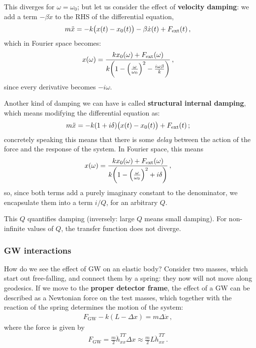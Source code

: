 \documentclass[main.tex]{subfiles}
\begin{document}
This diverges for \(\omega = \omega_0 \); but let us consider the effect of \textbf{velocity damping}: we add a term \(- \beta \dot{x}\) to the RHS of the differential equation,
%
\begin{align}
m \ddot{x} = - k \qty(x(t) - x_0 (t)) - \beta \dot{x}(t) + F _{\text{ext}}(t)
\,,
\end{align}
%
which in Fourier space becomes:
%
\begin{align}
x(\omega ) = \frac{k x_0 (\omega ) + F _{\text{ext}}(\omega )}{k \qty(1 - \qty( \frac{\omega}{\omega_0 })^2 - \frac{i \omega \beta }{k})}
\,,
\end{align}
%
since every derivative becomes \(- i \omega \). 

Another kind of damping we can have is called \textbf{structural internal damping}, which means modifying the differential equation as:
%
\begin{align}
m \ddot{x} = - k (1 + i \delta ) \qty(x(t) - x_0 (t)) + F _{\text{ext}}(t)
\,;
\end{align}
%
concretely speaking this means that there is some \emph{delay} between the action of the force and the response of the system. In Fourier space, this means 
%
\begin{align}
x(\omega ) = \frac{k x_0 (\omega ) + F _{\text{ext}}(\omega )}{k \qty(1 - \qty( \frac{\omega}{\omega_0 })^2 + i \delta )}
\,,
\end{align}
%
so, since both terms add a purely imaginary constant to the denominator, we encapsulate them into a term \(i / Q\), for an arbitrary \(Q\). 

This \(Q\) quantifies damping (inversely: large \(Q\) means small damping). For non-infinite values of \(Q\), the transfer function does not diverge.

\subsubsection{GW interactions}

How do we see the effect of GW on an elastic body?
Consider two masses, which start out free-falling, and connect them by a spring: they now will not move along geodesics.
If we move to the \textbf{proper detector frame}, the effect of a GW can be described as a Newtonian force on the test masses, which together with the reaction of the spring determines the motion of the system:
%
\begin{align}
F _{\text{GW}} - k (L - \Delta x) = m \Delta \ddot{x}
\,,
\end{align}
%
where the force is given by
%
\begin{align}
F_{\text{GW}} = \frac{m}{2} \ddot{h}^{TT}_{xx} \Delta x \approx \frac{m}{2} L \ddot{h}^{TT}_{xx}
\,.
\end{align}
\end{document}
